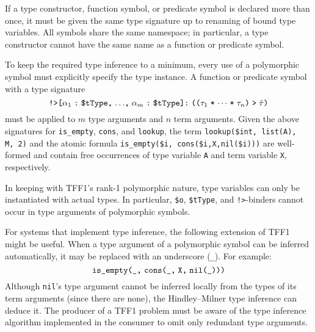 If a type constructor, function symbol, or predicate symbol is declared more
than once, it must be given the same type signature up to renaming of bound
type variables.
All symbols share the same namespace; in particular, a type constructor
cannot have the same name as a function or predicate symbol.


 To keep the required type
inference to a minimum, every use of a polymorphic symbol must explicitly
specify the type instance. A function or predicate symbol with a type signature
\[\hbox{{\tt !>[$\alpha_1$\;:\;\$tType,\;${\dots}$,\;$\alpha_m$\;:\;\$tType]:\;%
(($\tau_1$\;*\;${\cdots}$\;*\;$\tau_n$)\;>\;$\tilde \tau$)}}\]
must be applied to $m$ type arguments and $n$ term arguments. Given the above
signatures for {\tt is\_empty}, {\tt cons}, and {\tt lookup}, the term
\hbox{\tt lookup(\$int,\;\,list(A),\;\,M,\;\,2)}
and the atomic formula
\hbox{\tt is\_empty(\$i,\;\,cons(\$i,\;X,\;nil(\$i)))}
are well-formed and contain free occurrences of type variable {\tt A}
and term variable {\tt X}, respectively.

In keeping with TFF1's rank-1 polymorphic nature, type variables can only be
instantiated with actual types. In particular, \verb+$o+, \verb+$tType+,
and {\tt !>}-binders cannot occur in type arguments of polymorphic symbols.

For systems that implement type inference, the following extension
of TFF1 might be useful. When a type argument of
a polymorphic symbol can be inferred automatically, it may be
replaced with an underscore ({\tt \_}). For example:
\[\hbox{{\tt is\_empty(\_,} {\tt cons(\_,\;X,\;nil(\_)))}}\]
Although {\tt nil}'s type argument cannot be inferred locally from the types of
its term arguments (since there are none), the Hindley--Milner type inference
can deduce it. The producer of a TFF1 problem must be aware of the type
inference algorithm implemented in the consumer to omit only redundant type
arguments.

